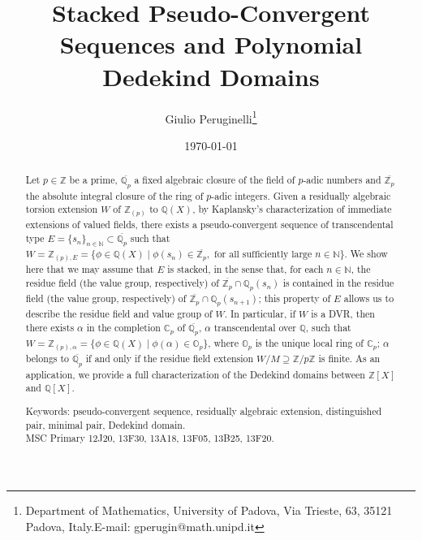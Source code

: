 \documentclass[10pt]{article}
\title{Stacked Pseudo-Convergent Sequences and Polynomial Dedekind Domains}
\date{\today}
\author{Giulio Peruginelli\footnote{Department of Mathematics, University of Padova, Via Trieste, 63, 35121 Padova, Italy.\newline E-mail: gperugin@math.unipd.it}
}
\numberwithin{equation}{section}
\theoremstyle{definition}\newtheorem{Def}[equation]{Definition}
\theoremstyle{definition}\newtheorem{Ques}[equation]{Question}
\newcommand{\Q}{\mathbb{Q}}
\newcommand{\N}{\mathbb{N}}
\newcommand{\Z}{\mathbb{Z}}
\renewcommand{\O}{\mathbb{O}}
\newcommand{\C}{\mathbb{C}}
\newcommand{\oQp}{\overline{\Q_p}}
\newcommand{\oZp}{\overline{\Z_p}}
\begin{document}
\maketitle


\begin{abstract}
Let $p\in\Z$ be a prime, $\oQp$ a fixed algebraic closure of the field of $p$-adic numbers and $\oZp$ the absolute integral closure of the ring of $p$-adic integers. Given a residually algebraic torsion extension $W$ of $\Z_{(p)}$ to $\Q(X)$, by Kaplansky's characterization of immediate extensions of valued fields, there exists a pseudo-convergent sequence of transcendental type $E=\{s_n\}_{n\in\N}\subset\oQp$  such that $W=\Z_{(p),E}=\{\phi\in\Q(X)\mid\phi(s_n)\in\oZp,\text{ for all sufficiently large }n\in\N\}$. We show here that we may assume that $E$ is stacked, in the sense that, for each $n\in\N$, the residue field (the value group, respectively) of  $\oZp\cap\Q_p(s_n)$ is contained in the residue field (the value group, respectively) of $\oZp\cap\Q_p(s_{n+1})$; this property of $E$ allows us to describe the residue field and value group of $W$. 
In particular, if $W$ is a DVR, then there exists $\alpha$ in the completion $\C_p$ of $\oQp$,  $\alpha$ transcendental  over $\Q$, such that $W=\Z_{(p),\alpha}=\{\phi\in\Q(X)\mid\phi(\alpha)\in \O_p\}$, where $\O_p$ is the unique local ring of $\C_p$; $\alpha$ belongs to $\oQp$ if and only if the residue field extension $W/M\supseteq\Z/p\Z$ is finite. As an application, we provide a full  characterization of the Dedekind domains between $\Z[X]$ and $\Q[X]$.

\noindent Keywords: pseudo-convergent sequence, residually algebraic extension, distinguished pair, minimal pair, Dedekind domain.\\

\noindent MSC Primary 12J20, 13F30, 13A18, 13F05, 13B25, 13F20.

\end{abstract}



\end{document}

